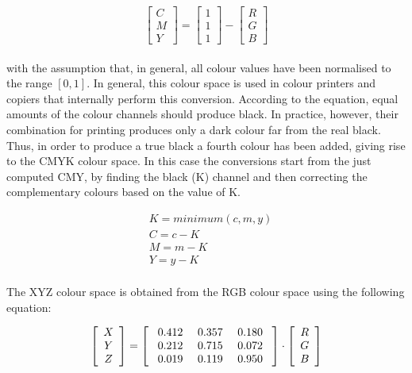 \documentclass[final,a4paper,12pt,english]{UnicaPhdThesis3}
\begin{document}
\begin{equation}
\left [ { \begin{array}{c} C  \\ M   \\ Y \end{array} } \right ] = 
\left [ { \begin{array}{c} 1   \\ 1   \\ 1 \end{array} } \right ]  - \left [ { \begin{array}{c} R  \\ G  \\ B     \end{array} } \right ] 
\end{equation}
 \\
with the assumption that, in general, all colour values have been normalised to the range $[0,1]$. In general, this colour space is used in colour printers and copiers that internally perform this conversion. According to the equation, equal amounts of the colour channels should produce black. In practice, however, their combination for printing produces only a dark colour far from the real black. Thus, in order to produce a true black a fourth colour has been added, giving rise to the CMYK colour space. In this case the conversions start from the just computed CMY, by finding the black (K) channel and then correcting the complementary colours based on the value of K.

\begin{equation}\label{cmyk}
\begin{split}
&K = minimum (c, m, y)\\
&C = c - K\\
&M = m - K\\
&Y = y - K\\
\end{split}
\end{equation}

The XYZ colour space is obtained from the RGB colour space using the following equation:

\begin{equation}
\left [ { \begin{array}{c} X  \\ Y   \\ Z \end{array} } \right ] = 
\left [ { \begin{array}{c c c} \mbox{ 0.412}  & \mbox{ 0.357} &  \mbox{ 0.180 } \\ \mbox{ 0.212} & \mbox{ 0.715} & \mbox{ 0.072 } \\ \mbox{ 0.019} & \mbox{ 0.119} & \mbox{ 0.950 }  \end{array} } \right ] \cdot \left [ { \begin{array}{c} R  \\ G  \\ B     \end{array} } \right ] 
\end{equation}
\end{document}
